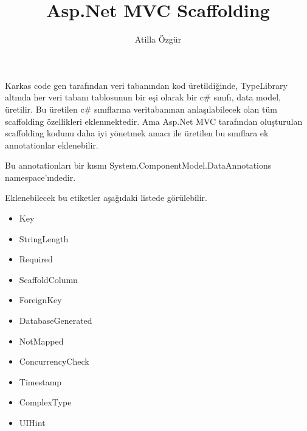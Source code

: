 \documentclass[10pt,a4paper]{article}
\newcommand{\authorName}{Atilla \"Ozg\"ur}
\newcommand{\titleName}{Asp.Net MVC Scaffolding}
\begin{document}
\author{\authorName}
\title{\titleName}

\maketitle


\maketitle



Karkas code gen tarafından veri tabanından kod üretildiğinde,
TypeLibrary altında her veri tabanı tablosunun bir eşi olarak
bir c\# sınıfı, data model, üretilir. 
Bu üretilen c\# sınıflarına veritabanınan anlaşılabilecek olan
tüm scaffolding özellikleri eklenmektedir.
Ama Asp.Net MVC tarafından oluşturulan scaffolding kodunu
daha iyi yönetmek amacı ile üretilen
bu sınıflara ek annotationlar eklenebilir.

Bu annotationları bir kısmı System.ComponentModel.DataAnnotations namespace'ındedir.



Eklenebilecek bu etiketler aşağıdaki listede \cite{Litwin2012AMV12:} görülebilir.



\begin{itemize}

\item  Key

\item  StringLength

\item  Required

\item ScaffoldColumn


\item ForeignKey

\item DatabaseGenerated

\item  NotMapped


\item  ConcurrencyCheck


\item  Timestamp

\item  ComplexType

\item  UIHint

\end{itemize}
\end{document}
